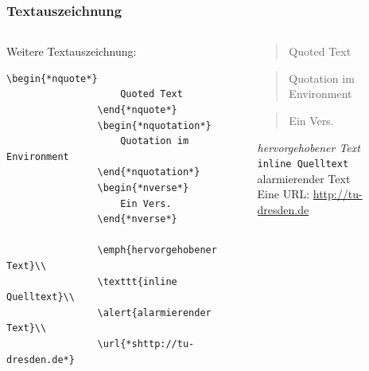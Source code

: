 \documentclass[german,notoc,draft]{tudbeamer}%
\begin{document}
\begin{frame}[fragile]
	\frametitle{Textauszeichnung}

	\begin{columns}[T,onlytextwidth]
		\begin{column}{.475\textwidth}
			Weitere Textauszeichnung:
			\begin{lstlisting}[gobble=8,style=latex]
				\begin{*nquote*}
					Quoted Text
				\end{*nquote*}
				\begin{*nquotation*}
					Quotation im Environment
				\end{*nquotation*}
				\begin{*nverse*}
					Ein Vers.
				\end{*nverse*}

				\emph{hervorgehobener Text}\\
				\texttt{inline Quelltext}\\
				\alert{alarmierender Text}\\
				\url{*shttp://tu-dresden.de*}
			\end{lstlisting} 
		\end{column}
		\begin{column}{.475\textwidth}
			\begin{quote}
				Quoted Text
			\end{quote}
			\begin{quotation}
				Quotation im Environment
			\end{quotation}
			\begin{verse}
				Ein Vers.
			\end{verse}

			\emph{hervorgehobener Text}\\
			\texttt{inline Quelltext}\\
			\alert{alarmierender Text}\\
			Eine URL: \url{http://tu-dresden.de}
		\end{column}
	\end{columns}
\end{frame}
\end{document}

